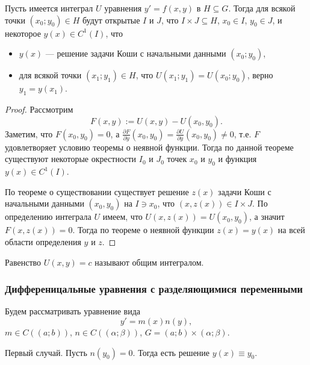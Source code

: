 \documentclass[12pt,a4paper]{article}
\begin{document}
    \begin{theorem}
        Пусть имеется интеграл $U$ уравнения $y' = f(x, y)$ в $H \subseteq G$. Тогда для всякой точки $(x_0; y_0) \in H$ будут открытые $I$ и $J$, что $I \times J \subseteq H$, $x_0 \in I$, $y_0 \in J$, и некоторое $y(x) \in C^1(I)$, что
        \begin{itemize}
            \item $y(x)$ --- решение задачи Коши с начальными данными $(x_0; y_0)$,
            \item для всякой точки $(x_1; y_1) \in H$, что $U(x_1; y_1) = U(x_0; y_0)$, верно $y_1 = y(x_1)$.
        \end{itemize}
    \end{theorem}

    \begin{proof}
        Рассмотрим
        \[F(x, y) := U(x, y) - U(x_0, y_0).\]
        Заметим, что $F(x_0, y_0) = 0$, а $\frac{\partial F}{\partial y}(x_0, y_0) = \frac{\partial U}{\partial y}(x_0, y_0) \neq 0$, т.е. $F$ удовлетворяет условию теоремы о неявной функции. Тогда по данной теореме существуют некоторые окрестности $I_0$ и $J_0$ точек $x_0$ и $y_0$ и функция $y(x) \in C^1(I)$.
        
        По теореме о существовании существует решение $z(x)$ задачи Коши с начальными данными $(x_0, y_0)$ на $I \ni x_0$, что $(x, z(x)) \in I \times J$. По определению интеграла $U$ имеем, что $U(x, z(x)) = U(x_0, y_0)$, а значит $F(x, z(x)) = 0$. Тогда по теореме о неявной функции $z(x) = y(x)$ на всей области определения $y$ и $z$. 
    \end{proof}

    \begin{remark}
        Равенство $U(x, y) = c$ называют общим интегралом.
    \end{remark}

    \subsubsection{Дифференицальные уравнения с разделяющимися переменными}

    Будем рассматривать уравнение вида
    \[y' = m(x) n(y),\]
    $m \in C((a; b))$, $n \in C((\alpha; \beta))$, $G = (a; b) \times (\alpha; \beta)$.

    Первый случай. Пусть $n(y_0) = 0$. Тогда есть решение $y(x) \equiv y_0$.
\end{document}
